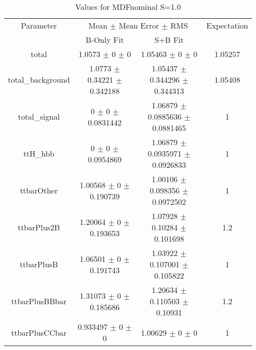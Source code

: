 \begin{table}
\centering
\caption{Values for MDFnominal S=1.0}
\begin{tabular}{cccc}
\toprule
Parameter & \multicolumn{2}{c}{Mean $\pm$ Mean Error $\pm$ RMS} & Expectation\\
 & B-Only Fit & S+B Fit & \\
\midrule
total & \num{1.0573} $\pm$ \num{0} $\pm$ \num{0} & \num{1.05463} $\pm$ \num{0} $\pm$ \num{0} & \num{1.05257}\\
total\_background & \num{1.0773} $\pm$ \num{0.34221} $\pm$ \num{0.342188} & \num{1.05437} $\pm$ \num{0.344296} $\pm$ \num{0.344313} & \num{1.05408}\\
total\_signal & \num{0} $\pm$ \num{0} $\pm$ \num{0.0831442} & \num{1.06879} $\pm$ \num{0.0885636} $\pm$ \num{0.0881465} & \num{1}\\
ttH\_hbb & \num{0} $\pm$ \num{0} $\pm$ \num{0.0954869} & \num{1.06879} $\pm$ \num{0.0935971} $\pm$ \num{0.0926833} & \num{1}\\
ttbarOther & \num{1.00568} $\pm$ \num{0} $\pm$ \num{0.190739} & \num{1.00106} $\pm$ \num{0.098356} $\pm$ \num{0.0972502} & \num{1}\\
ttbarPlus2B & \num{1.20064} $\pm$ \num{0} $\pm$ \num{0.193653} & \num{1.07928} $\pm$ \num{0.10284} $\pm$ \num{0.101698} & \num{1.2}\\
ttbarPlusB & \num{1.06501} $\pm$ \num{0} $\pm$ \num{0.191743} & \num{1.03922} $\pm$ \num{0.107001} $\pm$ \num{0.105822} & \num{1}\\
ttbarPlusBBbar & \num{1.31073} $\pm$ \num{0} $\pm$ \num{0.185686} & \num{1.20634} $\pm$ \num{0.110503} $\pm$ \num{0.10931} & \num{1.2}\\
ttbarPlusCCbar & \num{0.933497} $\pm$ \num{0} $\pm$ \num{0} & \num{1.00629} $\pm$ \num{0} $\pm$ \num{0} & \num{1}\\
\bottomrule
\end{tabular}
\end{table}